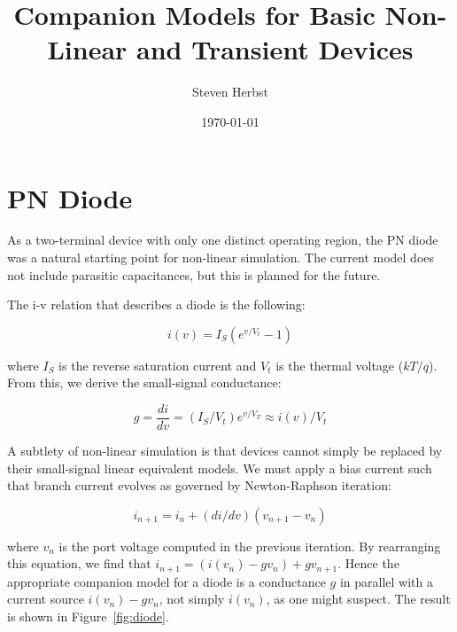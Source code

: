 \documentclass{article}
\begin{document}
\title{Companion Models for Basic Non-Linear and Transient Devices}
\author{Steven Herbst}
\date{\today}

\maketitle

\section{PN Diode}

As a two-terminal device with only one distinct operating region, the PN diode was a natural starting point for non-linear simulation.  The current model does not include parasitic capacitances, but this is planned for the future.

The i-v relation that describes a diode is the following:

\begin{equation}
i(v) = I_S(e^{v/V_t}-1)
\end{equation}

where $I_S$ is the reverse saturation current and $V_t$ is the thermal voltage ($kT/q$).  From this, we derive the small-signal conductance:

\begin{equation}
g = \frac{di}{dv} = (I_S/V_t) e^{v/V_T} \approx i(v)/V_t
\end{equation}

A subtlety of non-linear simulation is that devices cannot simply be replaced by their small-signal linear equivalent models.  We must apply a bias current such that branch current evolves as governed by Newton-Raphson iteration:

\begin{equation}
i_{n+1}=i_n+(di/dv)(v_{n+1}-v_n)
\end{equation}

where $v_n$ is the port voltage computed in the previous iteration.  By rearranging this equation, we find that $i_{n+1}=(i(v_n)-gv_n)+gv_{n+1}$.  Hence the appropriate companion model for a diode is a conductance $g$ in parallel with a current source $i(v_n)-gv_n$, not simply $i(v_n)$, as one might suspect.  The result is shown in Figure~\ref{fig:diode}.
\end{document}
